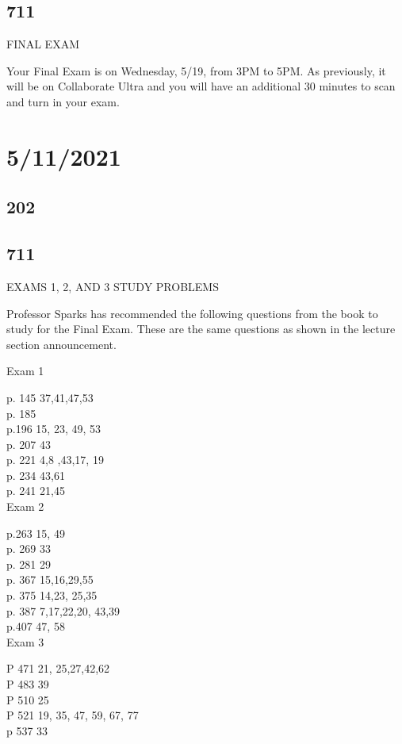 \documentclass[]{article}
\begin{document}
\subsection*{711}
FINAL EXAM

Your Final Exam is on Wednesday, 5/19, from 3PM to 5PM. As previously, it will be on Collaborate Ultra and you will have an additional 30 minutes to scan and turn in your exam.

\section*{5/11/2021}
\subsection*{202}
\subsection*{711}
EXAMS 1, 2, AND 3 STUDY PROBLEMS

Professor Sparks has recommended the following questions from the book to study for the Final Exam. These are the same questions as shown in the lecture section announcement.

Exam 1

p. 145 37,41,47,53 \\
p. 185  \\
p.196 15, 23, 49, 53 \\
p. 207 43 \\
p. 221 4,8 ,43,17, 19 \\
p. 234 43,61 \\
p. 241 21,45 \\

Exam 2

p.263 15, 49 \\
p. 269 33 \\
p. 281 29 \\
p. 367 15,16,29,55 \\
p. 375 14,23, 25,35 \\
p. 387 7,17,22,20, 43,39 \\
p.407 47, 58 \\

Exam 3

P 471 21, 25,27,42,62 \\
P 483 39 \\
P 510 25 \\
P 521 19, 35, 47, 59, 67, 77 \\
p 537 33
\end{document}
